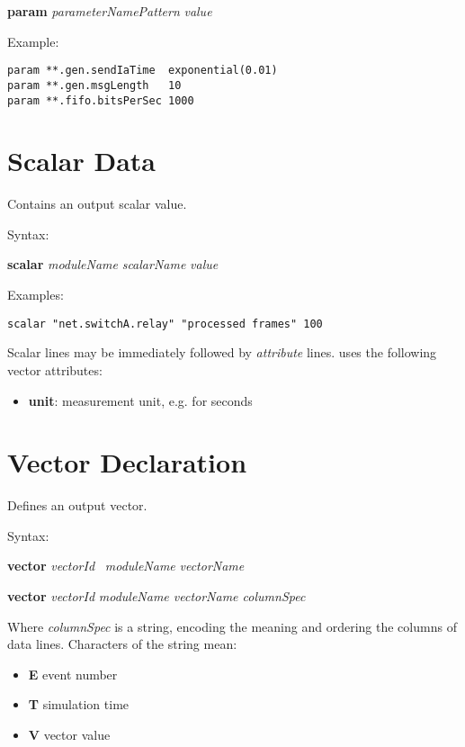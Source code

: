 \hspace{20mm} \textbf{param} \textit{parameterNamePattern} \textit{value}

Example:

\begin{verbatim}
param **.gen.sendIaTime  exponential(0.01)
param **.gen.msgLength   10
param **.fifo.bitsPerSec 1000
\end{verbatim}


\section{Scalar Data}

Contains an output scalar value.

Syntax:

\hspace{20mm} \textbf{scalar} \textit{moduleName} \textit{scalarName} \textit{value}

Examples:

\begin{verbatim}
scalar "net.switchA.relay" "processed frames" 100
\end{verbatim}

Scalar lines may be immediately followed by \textit{attribute} lines.
{\opp} uses the following vector attributes:

\begin{itemize}
    \item \textbf{unit}: measurement unit, e.g.  for seconds
\end{itemize}



\section{Vector Declaration}

Defines an output vector.

Syntax:

\hspace{20mm} \textbf{vector} \textit{vectorId} \ \textit{moduleName} \textit{vectorName}

\hspace{20mm} \textbf{vector }\textit{vectorId} \textit{moduleName vectorName columnSpec}

Where \textit{columnSpec} is a string, encoding the meaning and ordering
the columns of data lines. Characters of the string mean:

\begin{itemize}
  \item \textbf{E} event number
  \item \textbf{T} simulation time
  \item \textbf{V} vector value
\end{itemize}

